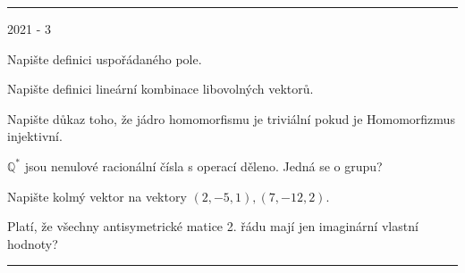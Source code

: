 \hrule

\newpage
{\large 2021 - 3}

\begin{questions}

\question Napište definici uspořádaného pole.

\question Napište definici lineární kombinace libovolných vektorů.

\question Napište důkaz toho, že jádro homomorfismu je triviální pokud je Homomorfizmus injektivní.

\question \(\mathbb{Q}^*\) jsou nenulové racionální čísla s operací děleno. Jedná se o grupu?

\question Napište kolmý vektor na vektory \((2, -5, 1), (7, -12, 2)\).

\question Platí, že všechny antisymetrické matice 2. řádu mají jen imaginární vlastní hodnoty?

\end{questions}

\hrule
